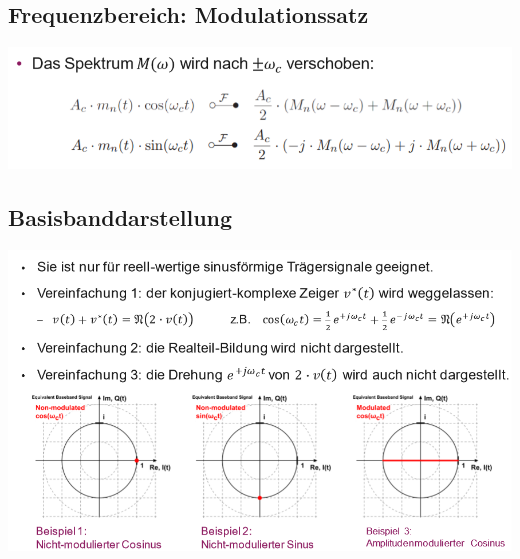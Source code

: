 \subsection{Frequenzbereich: Modulationssatz}
\includegraphics[width=\columnwidth]{Images/screenshot006}

\subsection{Basisbanddarstellung}
\includegraphics[width=\columnwidth]{Images/screenshot007}
